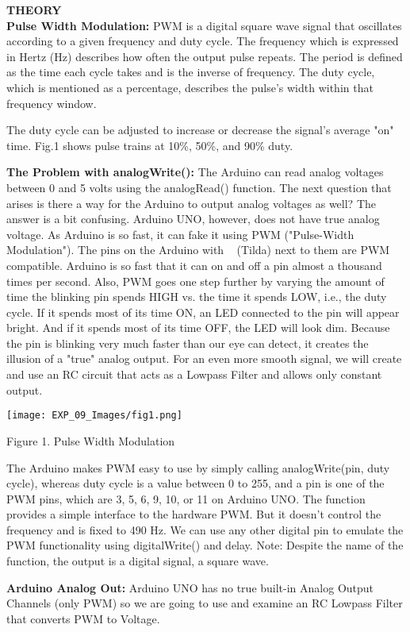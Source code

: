 \documentclass[12pt,a4paper]{article}
\begin{document}
\begin{justify}
\textbf{\large THEORY}\\[3pt]
\textbf{Pulse Width Modulation: } PWM is a digital square wave signal that oscillates according to a given frequency and duty cycle. The frequency which is expressed in Hertz (Hz) describes how often the output pulse repeats. The period is defined as the time each cycle takes and is the inverse of frequency. The duty cycle, which is mentioned as a percentage, describes the pulse's width within that frequency window.\par
\noindent The duty cycle can be adjusted to increase or decrease the signal's average "on" time. Fig.1 shows pulse trains at 10\%, 50\%, and 90\% duty.\par
\noindent \textbf{The Problem with analogWrite(): } The Arduino can read analog voltages between 0 and 5 volts using the analogRead() function. The next question that arises is there a way for the Arduino to output analog voltages as well? The answer is a bit confusing. Arduino UNO, however, does not have true analog voltage. As Arduino is so fast, it can fake it using PWM ("Pulse-Width Modulation"). The pins on the Arduino with ~ (Tilda) next to them are PWM compatible. Arduino is so fast that it can on and off a pin almost a thousand times per second. Also, PWM goes one step further by varying the amount of time the blinking pin spends HIGH vs. the time it spends LOW, i.e., the duty cycle. If it spends most of its time ON, an LED connected to the pin will appear bright. And if it spends most of its time OFF, the LED will look dim. Because the pin is blinking very much faster than our eye can detect, it creates the illusion of a "true" analog output. For an even more smooth signal, we will create and use an RC circuit that acts as a Lowpass Filter and allows only constant output. 

\begin{center} 
\texttt{[image: EXP\_09\_Images/fig1.png]}
\end{center}
\begin{center} {Figure 1. Pulse Width Modulation}\end{center}

\noindent The Arduino makes PWM easy to use by simply calling analogWrite(pin, duty cycle), whereas duty cycle is a value between 0 to 255, and a pin is one of the PWM pins, which are 3, 5, 6, 9, 10, or 11 on Arduino UNO. The function provides a simple interface to the hardware PWM. But it doesn't control the frequency and is fixed to 490 Hz. We can use any other digital pin to emulate the PWM functionality using digitalWrite() and delay. Note: Despite the name of the function, the output is a digital signal, a square wave. \par
\noindent \textbf{Arduino Analog Out:  }Arduino UNO has no true built-in Analog Output Channels (only PWM) so we are going to use and examine an RC Lowpass Filter that converts PWM to Voltage.


\end{justify}
\end{document}
